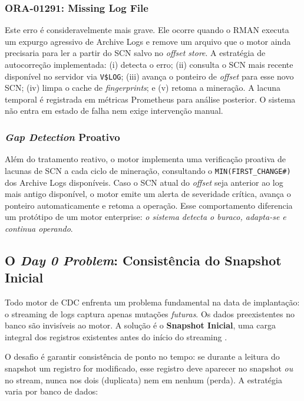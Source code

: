 \documentclass[12pt]{article}
\begin{document}
\subsubsection{ORA-01291: Missing Log File}

Este erro é consideravelmente mais grave. Ele ocorre quando o RMAN executa
um expurgo agressivo de Archive Logs e remove um arquivo que o motor ainda
precisaria para ler a partir do SCN salvo no \textit{offset store}. A
estratégia de autocorreção implementada: (i) detecta o erro; (ii) consulta
o SCN mais recente disponível no servidor via \texttt{V\$LOG}; (iii) avança
o ponteiro de \textit{offset} para esse novo SCN; (iv) limpa o cache de
\textit{fingerprints}; e (v) retoma a mineração. A lacuna temporal é
registrada em métricas Prometheus para análise posterior. O sistema não
entra em estado de falha nem exige intervenção manual.

\subsubsection{\textit{Gap Detection} Proativo}

Além do tratamento reativo, o motor implementa uma verificação proativa de
lacunas de SCN a cada ciclo de mineração, consultando o
\texttt{MIN(FIRST\_CHANGE\#)} dos Archive Logs disponíveis. Caso o SCN
atual do \textit{offset} seja anterior ao log mais antigo disponível, o
motor emite um alerta de severidade crítica, avança o ponteiro
automaticamente e retoma a operação. Esse comportamento diferencia um
protótipo de um motor enterprise: \textit{o sistema detecta o buraco,
adapta-se e continua operando}.

\subsection{O \textit{Day 0 Problem}: Consistência do Snapshot Inicial}

Todo motor de CDC enfrenta um problema fundamental na data de implantação:
o streaming de logs captura apenas mutações \textit{futuras}. Os dados
preexistentes no banco são invisíveis ao motor. A solução é o
\textbf{Snapshot Inicial}, uma carga integral dos registros existentes antes
do início do streaming \cite{kleppmann:2017}.

O desafio é garantir consistência de ponto no tempo: se durante a leitura
do snapshot um registro for modificado, esse registro deve aparecer no
snapshot \textit{ou} no stream, nunca nos dois (duplicata) nem em nenhum
(perda). A estratégia varia por banco de dados:
\end{document}
